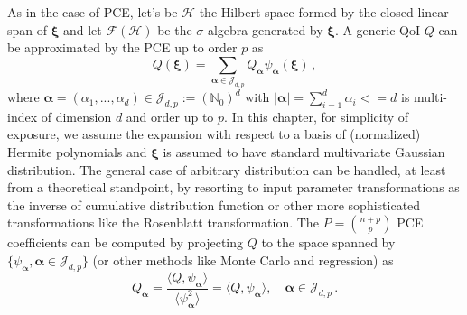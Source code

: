 As in the case of PCE, let's be $\mathcal{H}$ the Hilbert space formed by the closed linear span of $\bm{\xi}$ and let $\mathcal{F}(\mathcal{H})$ be the $\sigma$-algebra generated by $\bm{\xi}$. A 
generic QoI $Q$ can be approximated by the PCE up to order $p$ as
\begin{equation}
Q(\bm \xi) = \sum_{\bm{\alpha}\in\mathcal{J}_{d,p}}Q_{\bm{\alpha}}\psi_{\bm \alpha}(\bm \xi)\,,
\end{equation}
where $\bm{\alpha} = (\alpha_1,...,\alpha_d) \in \mathcal{J}_{d,p}:=(\mathbb{N}_0)^d$ with $|\bm{\alpha}| = \sum_{i=1}^{d} \alpha_i<= d$ is multi-index of dimension $d$ and order up to $p$.
In this chapter, for simplicity of exposure, we assume the expansion with respect to a basis of (normalized) Hermite polynomials and $\bm\xi$ is assumed to have standard multivariate Gaussian distribution.
The general case of arbitrary distribution can be handled, at least from a theoretical standpoint, by resorting to input parameter transformations as the inverse of cumulative distribution function or other more sophisticated transformations like the Rosenblatt transformation.
The $P={n+p\choose p}$ PCE coefficients can be computed by projecting $Q$ to the space spanned by  $\{\psi_{\bm \alpha}, \bm{\alpha} \in \mathcal{J}_{d,p} \}$ (or other methods like Monte Carlo and regression) as
\begin{equation}
Q_{\bm{\alpha}} = \frac{\langle Q, \psi_{\bm \alpha} \rangle}{\langle \psi_{\bm \alpha}^2 \rangle} =\langle Q, \psi_{\bm \alpha} \rangle,  \quad \bm{\alpha} \in \mathcal{J}_{d,p}\,.
\end{equation}

